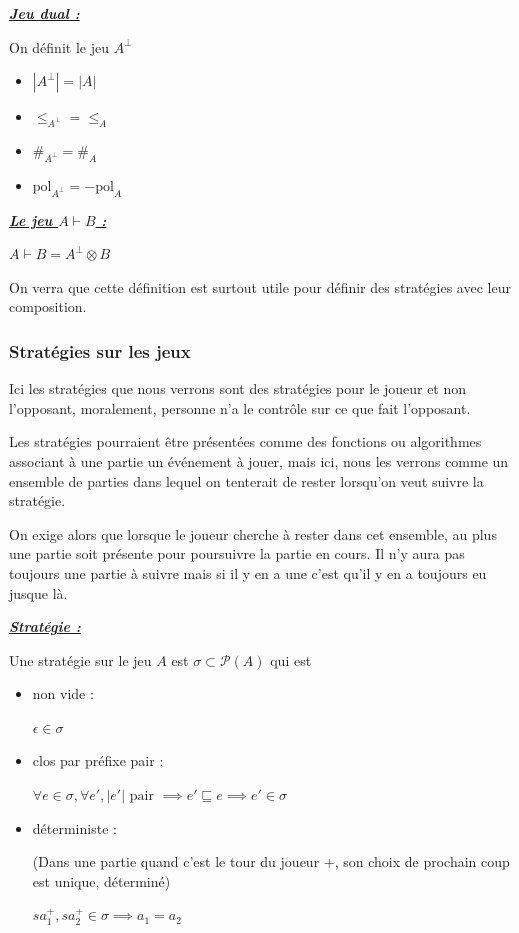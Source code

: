 \documentclass[a4paper,12pt]{article}
\renewenvironment{leftbar}{
  \def\FrameCommand{\vrule width 1pt \hspace{10pt}}
  \MakeFramed {\advance\hsize-\width \FrameRestore}
\setlength{\parskip}{10pt}}
 {\endMakeFramed}
\newenvironment{answer}[1]
{
  \vspace{0.5cm} \noindent \begin{minipage}{\linewidth}
    \textbf{\textit{\uline{#1}}}
    \begin{leftbar}
}
{
    \end{leftbar}\end{minipage}\vspace{0.2cm}
}
\begin{document}
\begin{answer}{Jeu dual :}
On définit le jeu $A^\bot$
\begin{itemize}
\item $|A^\bot| = |A|$
\item $\leq_{A^\bot} = \leq_A$
\item $\#_{A^\bot} = \#_A$
\item $\text{pol}_{A^\bot} = - \text{pol}_A$
\end{itemize}
\end{answer}

\begin{answer}{Le jeu $A \vdash B$ :}
$A \vdash B = A^\bot \otimes B$
\end{answer}

On verra que cette définition est surtout utile pour définir des stratégies
avec leur composition.

\subsubsection{Stratégies sur les jeux}

Ici les stratégies que nous verrons sont des stratégies pour le joueur et non
l'opposant, moralement, personne n'a le contrôle sur ce que fait l'opposant.

Les stratégies pourraient être présentées comme des fonctions ou algorithmes
associant à une partie un événement à jouer, mais ici, nous les verrons comme
un ensemble de parties dans lequel on tenterait de rester lorsqu'on veut suivre
la stratégie.

On exige alors que lorsque le joueur cherche à rester dans cet ensemble,
au plus une partie soit présente pour poursuivre la partie en cours.
Il n'y aura pas toujours une partie à suivre mais si il y en a une c'est qu'il
y en a toujours eu jusque là.

\begin{answer}{Stratégie :}
Une stratégie sur le jeu $A$ est $\sigma \subset \mathcal{P}(A)$ qui est
\begin{itemize}
\item non vide :

$\epsilon \in \sigma$

\item clos par préfixe pair :

$\forall e \in \sigma, \forall e', |e'| \text{ pair } \implies e' \sqsubseteq e \implies e' \in \sigma$

\item déterministe :

(Dans une partie quand c'est le tour du joueur +, son choix de prochain coup
est unique, déterminé)

$sa_1^+, sa_2^+ \in \sigma \implies a_1 = a_2$

\end{itemize}
\end{answer}
\end{document}
